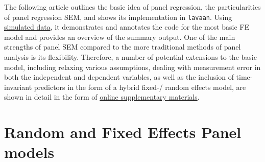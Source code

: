 \documentclass[]{interact}
\theoremstyle{plain}%
\theoremstyle{definition}
\theoremstyle{remark}
\begin{document}
The following article outlines the basic idea of panel regression, the
particularities of panel regression SEM, and shows its implementation in
\texttt{lavaan}. Using
\href{https://github.com/henrik-andersen/FE-SEM/blob/master/simulation-code.R}{simulated
data}, it demonstrates and annotates the code for the most basic FE
model and provides an overview of the summary output. One of the main
strengths of panel SEM compared to the more traditional methods of panel
analysis is its flexibility. Therefore, a number of potential extensions
to the basic model, including relaxing various assumptions, dealing with
measurement error in both the independent and dependent variables, as
well as the inclusion of time-invariant predictors in the form of a
hybrid fixed-/ random effects model, are shown in detail in the form of
\href{https://github.com/henrik-andersen/FE-SEM/blob/master/extensions.pdf}{online
supplementary materials}.

\hypertarget{panel}{%
\section{Random and Fixed Effects Panel models}\label{panel}}
\end{document}
